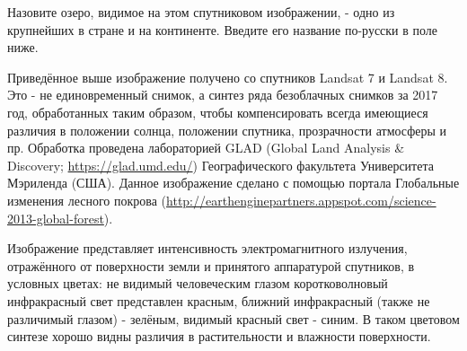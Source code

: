 
Назовите озеро, видимое на этом спутниковом изображении, - одно из крупнейших в стране и на континенте. Введите его название по-русски в поле ниже.


Приведённое выше изображение получено со спутников Landsat 7 и Landsat 8. Это - не единовременный снимок, 
а синтез ряда безоблачных снимков за 2017 год, обработанных таким образом, чтобы компенсировать всегда 
имеющиеся различия в положении солнца, положении спутника, прозрачности атмосферы и пр. 
Обработка проведена лабораторией GLAD (Global Land Analysis \& Discovery; \url{https://glad.umd.edu/}) Географического факультета Университета Мэриленда (США). 
Данное изображение сделано с помощью портала Глобальные изменения лесного покрова (\url{http://earthenginepartners.appspot.com/science-2013-global-forest}).

Изображение представляет интенсивность электромагнитного излучения, отражённого от поверхности земли и принятого аппаратурой спутников, в условных цветах: не видимый человеческим глазом коротковолновый инфракрасный свет представлен красным, ближний инфракрасный (также не различимый глазом) - зелёным, видимый красный свет - синим. В таком цветовом синтезе хорошо видны различия в растительности и влажности поверхности.

